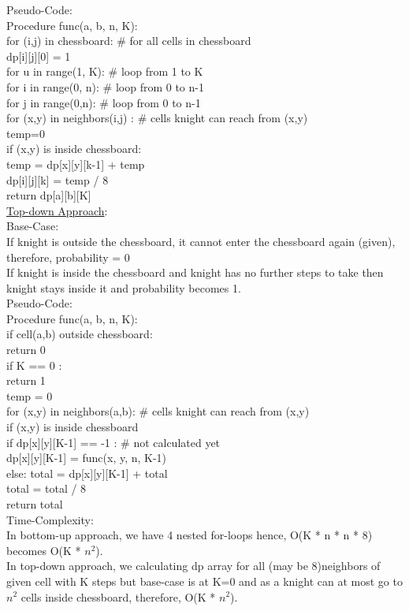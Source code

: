 \documentclass{article}
\newcommand\tab[1][4mm]{\hspace*{#1}}
\begin{document}
Pseudo-Code: \\
Procedure func(a, b, n, K): \\
\tab for (i,j) in chessboard: \# for all cells in chessboard \\
\tab\tab dp[i][j][0] = 1 \\
\tab for u in range(1, K): \# loop from 1 to K  \\
\tab\tab for i in range(0, n): \# loop from 0 to n-1 \\
\tab\tab\tab for j in range(0,n): \# loop from 0 to n-1 \\
\tab\tab\tab\tab for (x,y) in neighbors(i,j) : \# cells knight can reach from (x,y) \\
\tab\tab\tab\tab\tab temp=0 \\
\tab\tab\tab\tab\tab if (x,y) is inside chessboard: \\
\tab\tab\tab\tab\tab\tab temp = dp[x][y][k-1] + temp \\
\tab\tab\tab\tab\tab dp[i][j][k] = temp / 8 \\
\tab return dp[a][b][K] \\
\underline{Top-down Approach}: \\
Base-Case: \\
If knight is outside the chessboard, it cannot enter the chessboard again (given), therefore, probability = 0 \\
If knight is inside the chessboard and knight has no further steps to take then knight stays inside it and probability becomes 1. \\
Pseudo-Code: \\
Procedure func(a, b, n, K): \\
\tab if cell(a,b) outside chessboard: \\
\tab\tab return 0 \\
\tab if K == 0 : \\
\tab\tab return 1 \\
\tab temp = 0 \\
\tab for (x,y) in neighbors(a,b): \# cells knight can reach from (x,y) \\
\tab\tab if (x,y) is inside chessboard  \\
\tab\tab\tab if dp[x][y][K-1] == -1 : \# not calculated yet \\
\tab\tab\tab\tab dp[x][y][K-1] = func(x, y, n, K-1) \\
\tab\tab\tab else: total = dp[x][y][K-1] + total \\
\tab total = total / 8 \\
\tab return total \\
Time-Complexity: \\
In bottom-up approach, we have 4 nested for-loops hence, O(K * n * n * 8) becomes O(K * $n^2$). \\
In top-down approach, we calculating dp array for all (may be 8)neighbors of given cell with K steps but base-case is at K=0 and as a knight can at most go to $n^2$ cells inside chessboard, therefore, O(K * $n^2$).
     
\end{document}
